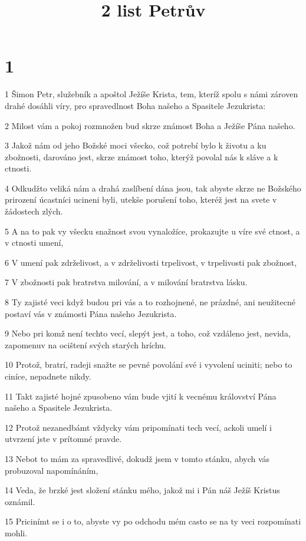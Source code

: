 

\title{2 list Petrův}

\chapter{1}

\par 1 Šimon Petr, služebník a apoštol Ježíše Krista, tem, kteríž spolu s námi zároven drahé dosáhli víry, pro spravedlnost Boha našeho a Spasitele Jezukrista:
\par 2 Milost vám a pokoj rozmnožen bud skrze známost Boha a Ježíše Pána našeho.
\par 3 Jakož nám od jeho Božské moci všecko, což potrebí bylo k životu a ku zbožnosti, darováno jest, skrze známost toho, kterýž povolal nás k sláve a k ctnosti.
\par 4 Odkudžto veliká nám a drahá zaslíbení dána jsou, tak abyste skrze ne Božského prirození úcastníci ucineni byli, utekše porušení toho, kteréž jest na svete v žádostech zlých.
\par 5 A na to pak vy všecku snažnost svou vynaložíce, prokazujte u víre své ctnost, a v ctnosti umení,
\par 6 V umení pak zdrželivost, a v zdrželivosti trpelivost, v trpelivosti pak zbožnost,
\par 7 V zbožnosti pak bratrstva milování, a v milování bratrstva lásku.
\par 8 Ty zajisté veci když budou pri vás a to rozhojnené, ne prázdné, ani neužitecné postaví vás v známosti Pána našeho Jezukrista.
\par 9 Nebo pri komž není techto vecí, slepýt jest, a toho, což vzdáleno jest, nevida, zapomenuv na ocištení svých starých hríchu.
\par 10 Protož, bratrí, radeji snažte se pevné povolání své i vyvolení uciniti; nebo to ciníce, nepadnete nikdy.
\par 11 Takt zajisté hojné zpusobeno vám bude vjití k vecnému království Pána našeho a Spasitele Jezukrista.
\par 12 Protož nezanedbámt vždycky vám pripomínati tech vecí, ackoli umelí i utvrzení jste v prítomné pravde.
\par 13 Nebot to mám za spravedlivé, dokudž jsem v tomto stánku, abych vás probuzoval napomínáním,
\par 14 Veda, že brzké jest složení stánku mého, jakož mi i Pán náš Ježíš Kristus oznámil.
\par 15 Pricinímt se i o to, abyste vy po odchodu mém casto se na ty veci rozpomínati mohli.
